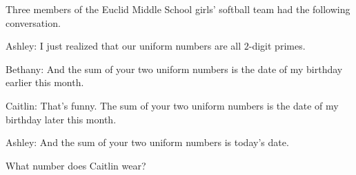 Three members of the Euclid Middle School girls' softball team had the following conversation.

Ashley: I just realized that our uniform numbers are all $2$-digit primes.

Bethany: And the sum of your two uniform numbers is the date of my birthday earlier this month.

Caitlin: That's funny. The sum of your two uniform numbers is the date of my birthday later this month.

Ashley: And the sum of your two uniform numbers is today's date.

What number does Caitlin wear?
